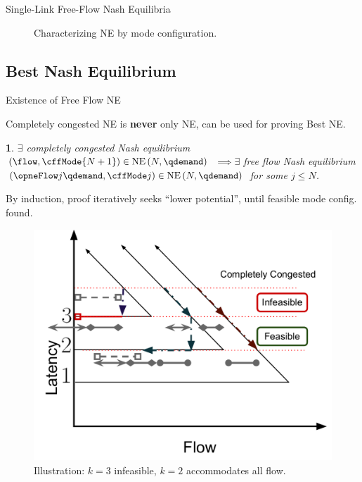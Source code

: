 \documentclass[xcolor=svgnames, english, smaller]{beamer}
\theoremstyle{plain}
\theoremstyle{definition}
\theoremstyle{plain}
\newtheorem{lem}[thm]{\protect\lemmaname}
\theoremstyle{plain}
\providecommand{\lemmaname}{Lemma}
\begin{document}
\begin{frame}{Single-Link Free-Flow Nash Equilibria}
\begin{figure}
{\begin{centering}
\par\end{centering}
}
\caption{Characterizing NE by mode configuration.}
\end{figure}


\end{frame}

\subsection{Best Nash Equilibrium}


\begin{frame}{Existence of Free Flow NE}

Completely congested NE is \textbf{never} only NE, can be used for
proving Best NE.
\begin{lem}
$\exists$ completely congested Nash equilibrium $\left(\flow,\cffMode{\NLinks+1}\right)\in\NashEquilibrium{\NLinks}{\qdemand}$ $\implies\exists$
free flow Nash equilibrium \textrm{\textup{$\left(\opneFlow j{\qdemand},\cffMode j\right)\in\NashEquilibrium{\NLinks}{\qdemand}$
for some $j\leq N$.}}
\end{lem}
By induction, proof iteratively seeks ``lower potential'', until
feasible mode config. found.

\begin{figure}
\begin{centering}
\includegraphics[scale=0.25]{../../figures/presentation/LemmaExistenceofSingleLinkFreeFlowNE}
\par\end{centering}

\caption{Illustration: $k=3$ infeasible, $k=2$ accommodates all flow.}
\end{figure}



\end{frame}
\end{document}
